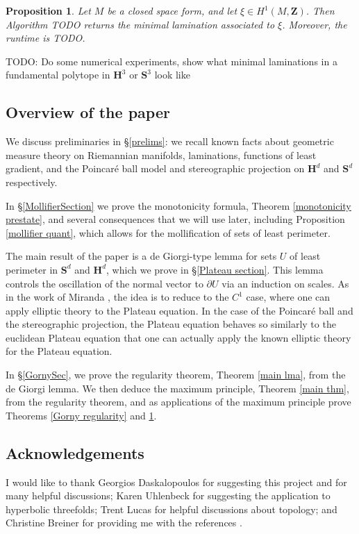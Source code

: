 \documentclass[reqno,10pt]{amsart}
\newcommand{\ZZ}{\mathbf{Z}}
\newcommand{\Hyp}{\mathbf H}
\newcommand{\Sph}{\mathbf S}
\newtheorem{proposition}[theorem]{Proposition}
\theoremstyle{definition}
\numberwithin{equation}{section}
\begin{document}
\begin{proposition}\label{application to Loisel}
Let $M$ be a closed space form, and let $\xi \in H^1(M, \ZZ)$.
Then Algorithm TODO returns the minimal lamination associated to $\xi$.
Moreover, the runtime is TODO.
\end{proposition}

TODO: Do some numerical experiments, show what minimal laminations in a fundamental polytope in $\Hyp^3$ or $\Sph^3$ look like


\subsection{Overview of the paper}
We discuss preliminaries in \S\ref{prelims}: we recall known facts about geometric measure theory on Riemannian manifolds, laminations, functions of least gradient, and the Poincar\'e ball model and stereographic projection on $\Hyp^d$ and $\Sph^d$ respectively.

In \S\ref{MollifierSection} we prove the monotonicity formula, Theorem \ref{monotonicity prestate}, and several consequences that we will use later, including Proposition \ref{mollifier quant}, which allows for the mollification of sets of least perimeter.

The main result of the paper is a de Giorgi-type lemma for sets $U$ of least perimeter in $\Sph^d$ and $\Hyp^d$, which we prove in \S\ref{Plateau section}.
This lemma controls the oscillation of the normal vector to $\partial U$ via an induction on scales.
As in the work of Miranda \cite{Miranda66}, the idea is to reduce to the $C^1$ case, where one can apply elliptic theory to the Plateau equation. In the case of the Poincar\'e ball and the stereographic projection, the Plateau equation behaves so similarly to the euclidean Plateau equation that one can actually apply the known elliptic theory for the Plateau equation.

In \S\ref{GornySec}, we prove the regularity theorem, Theorem \ref{main lma}, from the de Giorgi lemma.
We then deduce the maximum principle, Theorem \ref{main thm}, from the regularity theorem, and as applications of the maximum principle prove Theorems \ref{Gorny regularity} and \ref{application to Loisel}.


\subsection{Acknowledgements}
I would like to thank Georgios Daskalopoulos for suggesting this project and for many helpful discussions; Karen Uhlenbeck for suggesting the application to hyperbolic threefolds; Trent Lucas for helpful discussions about topology; and Christine Breiner for providing me with the references \cite{Allard72,colding2011course}.
\end{document}
